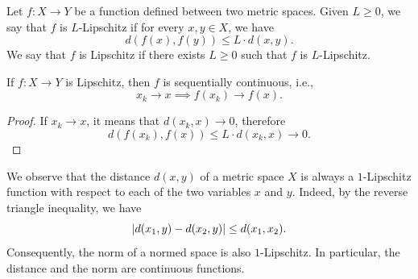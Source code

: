 \begin{definition}[Lipschitz]
\mymark{***}
Let $f\colon X \to Y$ be a function defined between two metric spaces.
Given $L\ge 0$,
we say that $f$ is $L$-Lipschitz if
for every $x,y \in X$, we have
\[
  d(f(x),f(y)) \le L \cdot d(x,y).
\]
We say that $f$ is Lipschitz if there exists $L\ge 0$ such that $f$ is
$L$-Lipschitz.
\end{definition}

\begin{theorem}
\label{th:lipschitz_uniformemente_continua}%
\mymark{*}%
If $f\colon X \to Y$ is Lipschitz, then
$f$ is sequentially continuous, i.e.,
\[
  x_k \to x \implies f(x_k)\to f(x).
\]
\end{theorem}
%
\begin{proof}
If $x_k\to x$, it means that $d(x_k,x) \to 0$, therefore
\[
  d(f(x_k), f(x)) \le L \cdot d(x_k,x) \to 0.
\]
\end{proof}

We observe that the distance $d(x,y)$ of a metric space $X$ is always a
$1$-Lipschitz function with respect to each of the two variables $x$ and $y$.
Indeed, by the reverse triangle inequality, we have
\[
  {\left|d(x_1,y) - d(x_2,y)\right|} \le d(x_1, x_2).
\]
Consequently, the norm of a normed space is also $1$-Lipschitz. 
In particular, the distance and the norm are continuous functions.

